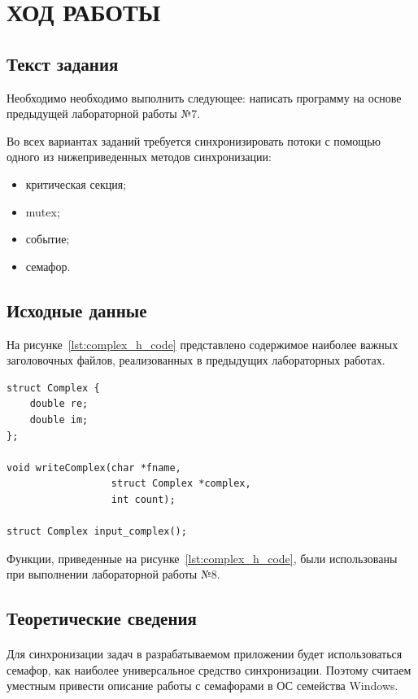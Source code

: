 \section{ХОД РАБОТЫ}

\subsection{Текст задания}

Необходимо необходимо выполнить следующее:
написать программу на основе предыдущей лабораторной работы №7.

Во всех вариантах заданий требуется синхронизировать потоки с помощью
одного из нижеприведенных методов синхронизации:

\begin{itemize}
\item критическая секция;
\item mutex;
\item событие;
\item семафор.
\end{itemize}

\subsection{Исходные данные}

На рисунке~\ref{lst:complex_h_code} представлено содержимое наиболее
важных заголовочных файлов, реализованных в предыдущих лабораторных работах.

\begin{lstlisting}[caption=Исходный код заголовочного файла complex.h,label=lst:complex_h_code]
struct Complex {
    double re;
    double im;
};

void writeComplex(char *fname,
                  struct Complex *complex,
                  int count);

struct Complex input_complex();
\end{lstlisting}

Функции, приведенные на рисунке~\ref{lst:complex_h_code},
были использованы при выполнении лабораторной работы №8.

\subsection{Теоретические сведения}
\label{ssec:therory}

\paragraph{}
Для синхронизации задач в разрабатываемом приложении будет использоваться 
семафор, как наиболее универсальное средство синхронизации.
Поэтому считаем уместным привести описание работы с семафорами в
ОС семейства Windows.

